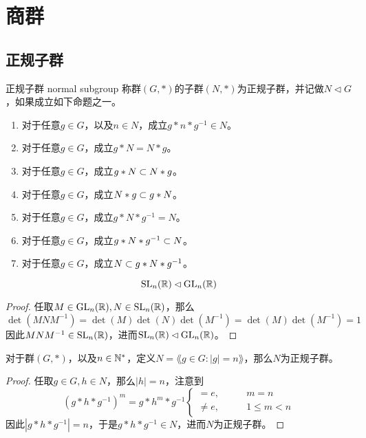 \section{商群}

\subsection{正规子群}

\begin{definition}{正规子群 normal subgroup}
	称群$(G,*)$的子群$(N,*)$为正规子群，并记做$N \lhd  G$，如果成立如下命题之一。
	\begin{enumerate}
		\item 对于任意$g\in G$，以及$n\in N$，成立$g*n*g^{-1}\in N$。
		\item 对于任意$g\in G$，成立$g*N=N*g$。
		\item 对于任意$g\in G$，成立$g*N\subset N*g$。
		\item 对于任意$g\in G$，成立$N*g\subset g*N$。
		\item 对于任意$g\in G$，成立$g*N*g^{-1}=N$。
		\item 对于任意$g\in G$，成立$g*N*g^{-1}\subset N$。
		\item 对于任意$g\in G$，成立$N\subset g*N*g^{-1}$。
	\end{enumerate}
\end{definition}

\begin{example}
	$$
	\mathrm{SL}_n(\mathbb{R})\lhd \mathrm{GL}_n(\mathbb{R})
	$$
\end{example}

\begin{proof}
	任取$M\in \mathrm{GL}_n(\mathbb{R}),N\in \mathrm{SL}_n(\mathbb{R})$，那么
	$$
	\det(MNM^{-1})=\det(M)\det(N)\det(M^{-1})=\det(M)\det(M^{-1})=1
	$$
	因此$MNM^{-1}\in \mathrm{SL}_n(\mathbb{R})$，进而$\mathrm{SL}_n(\mathbb{R})\lhd \mathrm{GL}_n(\mathbb{R})$。
\end{proof}

\begin{example}
	对于群$(G,*)$，以及$n\in\mathbb{N}^*$，定义$N=\lang g\in G:|g|=n \rang$，那么$N$为正规子群。
\end{example}

\begin{proof}
	任取$g\in G,h\in N$，那么$|h|=n$，注意到
	$$
	(g*h*g^{-1})^m=g*h^{m}*g^{-1}\begin{cases}
		=e,\qquad & m=n\\
		\ne e,\qquad & 1\le m<n
	\end{cases}
	$$
	因此$|g*h*g^{-1}|=n$，于是$g*h*g^{-1}\in N$，进而$N$为正规子群。
\end{proof}

